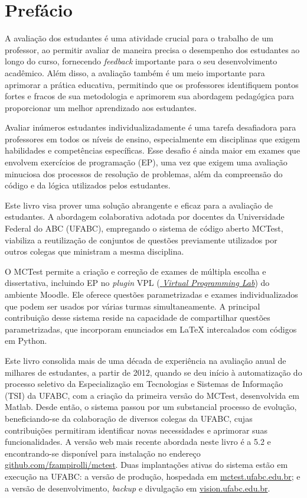 \chapter*{Prefácio}\normalsize

A avaliação dos estudantes é uma atividade crucial para o trabalho de um professor, ao permitir avaliar de maneira precisa o desempenho dos estudantes ao longo do curso, fornecendo \textit{feedback} importante para o seu desenvolvimento acadêmico. Além disso, a avaliação também é um meio importante para aprimorar a prática educativa, permitindo que os professores identifiquem pontos fortes e fracos de sua metodologia e aprimorem sua abordagem pedagógica para proporcionar um melhor aprendizado aos estudantes.

Avaliar inúmeros estudantes individualizadamente é uma tarefa desafiadora para professores em todos os níveis de ensino, especialmente em disciplinas que exigem habilidades e competências específicas. Esse desafio é ainda maior em exames que envolvem exercícios de programação (EP), uma vez que exigem uma avaliação minuciosa dos processos de resolução de problemas, além da compreensão do código e da lógica utilizados pelos estudantes.

Este livro visa prover uma solução abrangente e eficaz para a avaliação de estudantes. A abordagem colaborativa adotada por docentes da Universidade Federal do ABC (UFABC), empregando o sistema de código aberto MCTest, viabiliza a reutilização de conjuntos de questões previamente utilizados por outros colegas que ministram a mesma disciplina.

O  MCTest permite a criação e correção de exames de múltipla escolha e dissertativa, incluindo EP no \textit{plugin} VPL (\href{https://vpl.dis.ulpgc.es}{ \textit{Virtual Programming Lab}}) do ambiente Moodle. Ele oferece questões parametrizadas e exames individualizados que podem ser usados por várias turmas simultaneamente. A principal contribuição desse sistema reside na capacidade de compartilhar questões parametrizadas, que incorporam enunciados em \LaTeX{} intercalados com códigos em Python. 

Este livro consolida mais de uma década de experiência na avaliação anual de milhares de estudantes, a partir de 2012, quando se deu início à automatização do processo seletivo da Especialização em Tecnologias e Sistemas de Informação (TSI) da UFABC, com a criação da primeira versão do MCTest, desenvolvida em Matlab. Desde então, o sistema passou por um substancial processo de evolução, beneficiando-se da colaboração de diversos colegas da UFABC, cujas contribuições permitiram identificar novas necessidades e aprimorar suas funcionalidades. A versão web mais recente abordada neste livro é a 5.2 e encontrando-se disponível para instalação no endereço \href{https://github.com/fzampirolli/mctest}{github.com/fzampirolli/mctest}. Duas implantações ativas do sistema estão em execução na UFABC: a versão de produção, hospedada em \href{http://mctest.ufabc.edu.br}{mctest.ufabc.edu.br}; e a versão de desenvolvimento, \textit{backup} e divulgação em \href{http://vision.ufabc.edu.br}{vision.ufabc.edu.br}.

